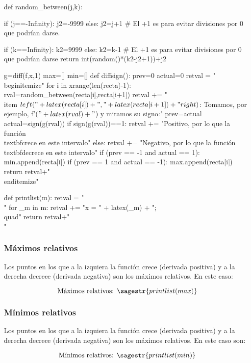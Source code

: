 \begin{sagesilent}

def random_between(j,k):
    
    if (j==-Infinity):
        j2=-9999
    else:
        j2=j+1 # El +1 es para evitar divisiones por 0 que podrían darse.
        
    if (k==Infinity):
        k2=9999
    else:        
        k2=k-1 # El +1 es para evitar divisiones por 0 que podrían darse
    return int(random()*(k2-j2+1))+j2

g=diff(f,x,1)
max=[]
min=[]
def diffsign():
    prev=0
    actual=0
    retval = "\\begin{itemize}"
    for i in xrange(len(recta)-1):
        rval=random_between(recta[i],recta[i+1])
        retval += "\\item $\\left("+latex(recta[i])+","+latex(recta[i+1])+"\\right)$: Tomamos, por ejemplo, f'($"+latex(rval)+"$) y miramos su signo:" 
        prev=actual
        actual=sign(g(rval))
        if sign(g(rval))==1: 
            retval += "Positivo, por lo que la función \\textbf{crece} en este intervalo"  
        else:
            retval += "Negativo, por lo que la función \\textbf{decrece} en este intervalo"
        if (prev == -1 and actual == 1):
            min.append(recta[i])
        if (prev == 1 and actual == -1):
            max.append(recta[i])
    return retval+"\\end{itemize}"

def printlist(m):
    retval = "\\{"
    for _m in m:
    	retval += "x = " + latex(_m) + ";\\quad"
    return retval+"\\}"

\end{sagesilent}


\subsubsection{Máximos relativos}
Los puntos en los que a la izquiera la función crece (derivada positiva) y a la derecha decrece (derivada negativa) son los máximos relativos. En este caso: 

\[\text{Máximos relativos: } \sagestr{printlist(max)}\]

\subsubsection{Mínimos relativos}
Los puntos en los que a la izquiera la función crece (derivada positiva) y a la derecha decrece (derivada negativa) son los máximos relativos. En este caso son: 

\[\text{Mínimos relativos: }\sagestr{printlist(min)}\]

